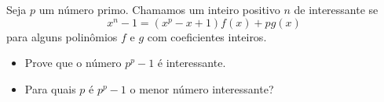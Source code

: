 Seja \(p\) um número primo. Chamamos um inteiro positivo \(n\) de interessante se
\[x^n-1=(x^p-x+1)f(x)+pg(x)\]
para alguns polinômios \(f\) e \(g\) com coeficientes inteiros.\begin{itemize}

\item[(a)] Prove que o número \(p^p-1\) é interessante.
\item[(b)] Para quais \(p\) é \(p^p-1\) o menor número interessante?
\end{itemize}
